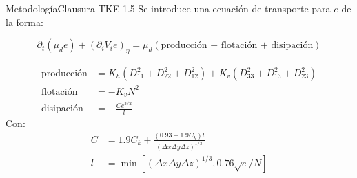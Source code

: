 \documentclass[mathserif]{beamer}
\begin{document}
\begin{frame}{Metodología}{Clausura TKE 1.5}
	Se introduce una ecuación de transporte para $e$ de la forma:
	\bigskip
	
	{\footnotesize
	\begin{equation}
	\partial_t(\mu_d e) + (\partial_i V_i e)_\eta = \mu_d(\text{producción + flotación + disipación})
	\end{equation}}

{\small
	\begin{align}
	\text{producción}&= K_h (D_{11}^2 + D_{22}^2 + D_{12}^2) + K_v (D_{33}^2 + D_{13}^2 + D_{23}^2)\\
	\text{flotación}&=-K_v N^2\\
	\text{disipación}&=-\frac{C e^{3/2}}{l}
	\end{align}}
Con:
{\small
\begin{align}
C &= 1.9C_k + \frac{(0.93 - 1.9 C_k)l}{(\Delta x \Delta y \Delta z)^{1/3}}\\
l &= \min[(\Delta x \Delta y \Delta z)^{1/3}, 0.76\sqrt{e}/N]
\end{align}}
\end{frame}
\end{document}
